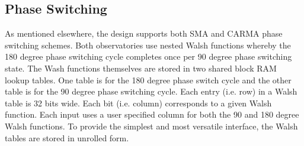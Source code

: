 \documentclass[12pt]{article}
\begin{document}
  \subsection{Phase Switching}

As mentioned elsewhere, the design supports both SMA and CARMA phase switching
schemes.  Both observatories use nested Walsh functions whereby the 180 degree
phase switching cycle completes once per 90 degree phase switching state.  The
Wash functions themselves are stored in two shared block RAM lookup tables.
One table is for the 180 degree phase switch cycle and the other table is for
the 90 degree phase switching cycle.  Each entry (i.e. row) in a Walsh table is
32 bits wide.  Each bit (i.e. column) corresponds to a given Walsh function.
Each input uses a user specified column for both the 90 and 180 degree Walsh
functions.  To provide the simplest and most versatile interface, the Walsh
tables are stored in unrolled form.
\end{document}
